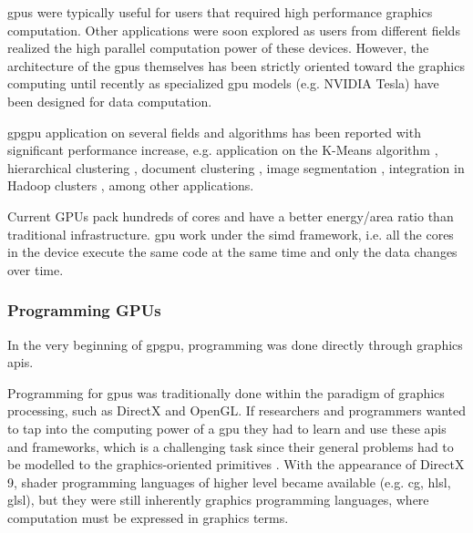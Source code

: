 \gls{gpu}s were typically useful for users that required high performance graphics computation. Other applications were soon explored as users from different fields realized the high parallel computation power of these devices. However, the architecture of the \gls{gpu}s themselves has been strictly oriented toward the graphics computing until recently as specialized \gls{gpu} models (e.g. NVIDIA Tesla) have been designed for data computation.

\gls{gpgpu} application on several fields and algorithms has been reported with significant performance increase, e.g. application on the K-Means algorithm \cite{Bai2009,Wu2011,Zechner2009,Wu2009a}, hierarchical clustering \cite{Shalom2009,ArulShalom2011}, document clustering \cite{gao20xx}, image segmentation \cite{Sirotkovi2012}, integration in Hadoop clusters \cite{Malakar2013,Grossman2013}, among other applications.

Current GPUs pack hundreds of cores and have a better energy/area ratio than traditional infrastructure.
\gls{gpu} work under the \gls{simd} framework, i.e. all the cores in the device execute the same code at the same time and only the data changes over time.





\subsubsection{Programming GPUs}


In the very beginning of \gls{gpgpu}, programming was done directly through graphics \gls{api}s. 

Programming for \gls{gpu}s was traditionally done within the paradigm of graphics processing, such as DirectX and OpenGL. If researchers and programmers wanted to tap into the computing power of a \gls{gpu} they had to learn and use these \gls{api}s and frameworks, which is a challenging task since their general problems had to be modelled to the graphics-oriented primitives \cite{Misi2012}. With the appearance of DirectX 9, shader programming languages of higher level became available (e.g. \gls{cg}, \gls{hlsl}, \gls{glsl}), but they were still inherently graphics programming languages, where computation must be expressed in graphics terms. 

